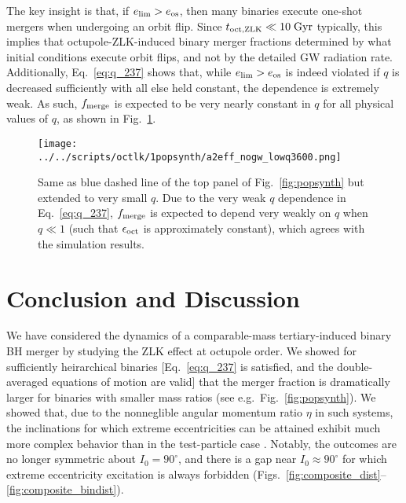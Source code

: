 \documentclass[
        fleqn,
        usenatbib,
    ]{mnras}
\newlength{\colummwidth}
\begin{document}
The key insight is that, if $e_{\lim} > e_{\rm os}$, then many binaries execute
one-shot mergers when undergoing an orbit flip. Since $t_{\rm oct,
ZLK} \ll 10\;\mathrm{Gyr}$ typically, this implies that octupole-ZLK-induced
binary merger fractions determined by what initial conditions execute orbit
flips, and not by the detailed GW radiation rate. Additionally,
Eq.~\eqref{eq:q_237} shows that, while $e_{\lim} > e_{\rm os}$ is indeed
violated if $q$ is decreased sufficiently with all else held constant, the
dependence is extremely weak. As such, $f_{\rm merge}$ is expected to be very
nearly constant in $q$ for all physical values of $q$, as shown in
Fig.~\ref{fig:popsynth_lowq}.
\begin{figure}
    \centering
    \texttt{[image: ../../scripts/octlk/1popsynth/a2eff\_nogw\_lowq3600.png]}
    \caption{Same as blue dashed line of the top panel of
    Fig.~\ref{fig:popsynth} but extended to very small $q$. Due to the very weak
    $q$ dependence in Eq.~\eqref{eq:q_237}, $f_{\rm merge}$ is expected to
    depend very weakly on $q$ when $q \ll 1$ (such that $\epsilon_{\rm oct}$ is
    approximately constant), which agrees with the simulation
    results.}\label{fig:popsynth_lowq}
\end{figure}

\section{Conclusion and Discussion}

We have considered the dynamics of a comparable-mass tertiary-induced binary BH
merger by studying the ZLK effect at octupole order. We showed for sufficiently
heirarchical binaries [Eq.~\eqref{eq:q_237} is satisfied, and the
double-averaged equations of motion are valid] that the merger fraction is
dramatically larger for binaries with smaller mass ratios (see
e.g.\ Fig.~\ref{fig:popsynth}). We showed that, due to the nonneglible angular
momentum ratio $\eta$ in such systems, the inclinations for which extreme
eccentricities can be attained exhibit much more complex behavior than in the
test-particle case \citep[as studied by][]{katz2011long, lithwick2011eccentric,
LML15, MLL16}. Notably, the outcomes are no longer symmetric about $I_0 =
90^\circ$, and there is a gap near $I_0 \approx 90^\circ$ for which extreme
eccentricity excitation is always forbidden
(Figs.~\ref{fig:composite_dist}--\ref{fig:composite_bindist}).
\end{document}
